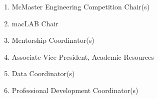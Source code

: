 \begin{enumerate}
  \begin{enumerate}
   \item
    McMaster Engineering Competition Chair(s)
   \item
    macLAB Chair
   \item
    Mentorship Coordinator(s)
   \item
    Associate Vice President, Academic Resources
   \item
    Data Coordinator(s)
   \item
    Professional Development Coordinator(s)

  \end{enumerate}
\end{enumerate}